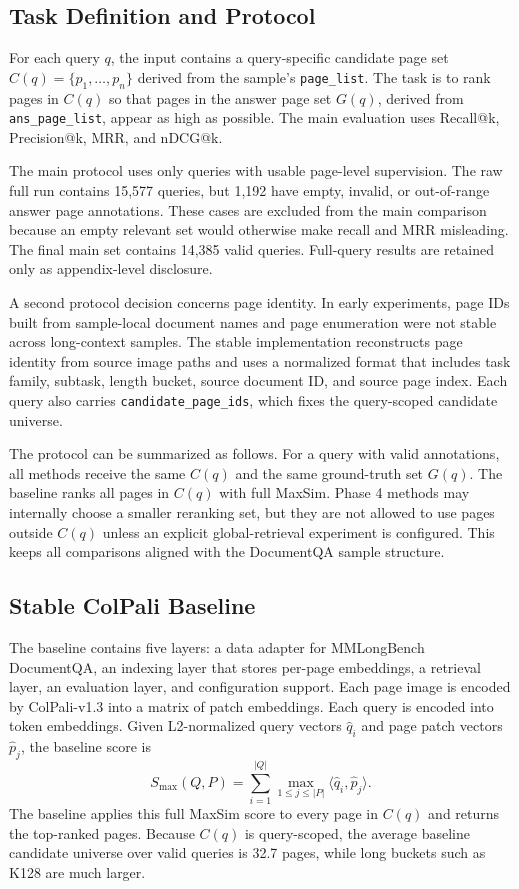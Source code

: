 \documentclass[11pt]{article}
\begin{document}
\subsection{Task Definition and Protocol}

For each query $q$, the input contains a query-specific candidate page set $C(q)=\{p_1,\ldots,p_n\}$ derived from the sample's \texttt{page\_list}. The task is to rank pages in $C(q)$ so that pages in the answer page set $G(q)$, derived from \texttt{ans\_page\_list}, appear as high as possible. The main evaluation uses Recall@k, Precision@k, MRR, and nDCG@k.

The main protocol uses only queries with usable page-level supervision. The raw full run contains 15,577 queries, but 1,192 have empty, invalid, or out-of-range answer page annotations. These cases are excluded from the main comparison because an empty relevant set would otherwise make recall and MRR misleading. The final main set contains 14,385 valid queries. Full-query results are retained only as appendix-level disclosure.

A second protocol decision concerns page identity. In early experiments, page IDs built from sample-local document names and page enumeration were not stable across long-context samples. The stable implementation reconstructs page identity from source image paths and uses a normalized format that includes task family, subtask, length bucket, source document ID, and source page index. Each query also carries \texttt{candidate\_page\_ids}, which fixes the query-scoped candidate universe.

The protocol can be summarized as follows. For a query with valid annotations, all methods receive the same $C(q)$ and the same ground-truth set $G(q)$. The baseline ranks all pages in $C(q)$ with full MaxSim. Phase 4 methods may internally choose a smaller reranking set, but they are not allowed to use pages outside $C(q)$ unless an explicit global-retrieval experiment is configured. This keeps all comparisons aligned with the DocumentQA sample structure.

\subsection{Stable ColPali Baseline}

The baseline contains five layers: a data adapter for MMLongBench DocumentQA, an indexing layer that stores per-page embeddings, a retrieval layer, an evaluation layer, and configuration support. Each page image is encoded by ColPali-v1.3 into a matrix of patch embeddings. Each query is encoded into token embeddings. Given L2-normalized query vectors $\hat{q}_i$ and page patch vectors $\hat{p}_j$, the baseline score is
\begin{equation}
S_{\mathrm{max}}(Q,P)=
\sum_{i=1}^{|Q|}\max_{1 \leq j \leq |P|}
\langle \hat{q}_i, \hat{p}_j\rangle .
\end{equation}
The baseline applies this full MaxSim score to every page in $C(q)$ and returns the top-ranked pages. Because $C(q)$ is query-scoped, the average baseline candidate universe over valid queries is 32.7 pages, while long buckets such as K128 are much larger.
\end{document}

